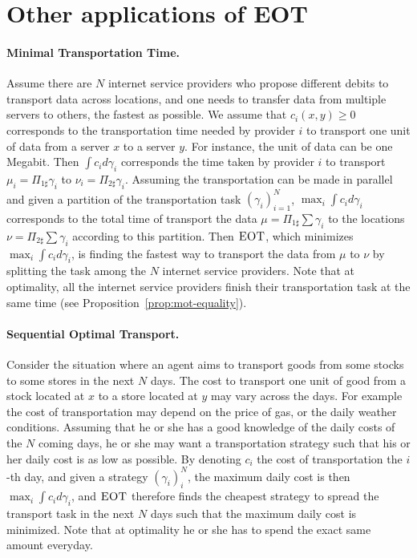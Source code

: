 \section{Other applications of EOT}

\paragraph{Minimal Transportation Time.} Assume there are $N$ internet service providers who propose different debits to transport data across locations, and one needs to transfer data from multiple servers to others, the fastest as possible.   We assume that $c_i(x,y)\geq 0$ corresponds to the transportation time needed by provider $i$ to transport one unit of data from a server $x$ to a server $y$. For instance, the unit of data can be one Megabit. Then $\int c_i d\gamma_i$ corresponds the time taken by provider $i$ to transport $\mu_i=\Pi_{1\sharp}\gamma_i$ to $\nu_i=\Pi_{2\sharp}\gamma_i$. Assuming the transportation can be made in parallel and given a partition of the transportation task $(\gamma_i)_{i=1}^N$, $\max_i\int c_i d\gamma_i$ corresponds to the total time of transport the data $\mu=\Pi_{1\sharp}\sum\gamma_i $ to the locations $\nu=\Pi_{2\sharp}\sum\gamma_i$ according to this partition. Then $\textsc{EOT}$, which minimizes $\max_i\int c_i d\gamma_i$, is finding the fastest way to transport the data from $\mu$ to $\nu$ by splitting the task among the $N$ internet service providers. Note that at optimality, all the internet service providers finish their transportation task at the same time (see Proposition~\ref{prop:mot-equality}).
 
\paragraph{Sequential Optimal Transport.} Consider the situation where an agent aims to transport goods from some stocks to some stores in the next $N$ days. The cost to transport one unit of good from a stock located at $x$ to a store located at $y$ may vary across the days. For example the cost of transportation may depend on the price of gas, or the daily weather conditions. Assuming that he or she has a good knowledge of the daily costs of the $N$ coming days, he or she may want a transportation strategy such that his or her daily cost is as low as possible. By denoting $c_i$ the cost of transportation the $i$-th day, and given a strategy $(\gamma_i)_{i}^N$, the maximum daily cost is then $\max_i\int c_i d\gamma_i$, and $\textsc{EOT}$ therefore finds the cheapest strategy to spread the transport task in the next $N$ days such that the maximum daily cost is minimized. Note that at optimality he or she has to spend the exact same amount everyday.


